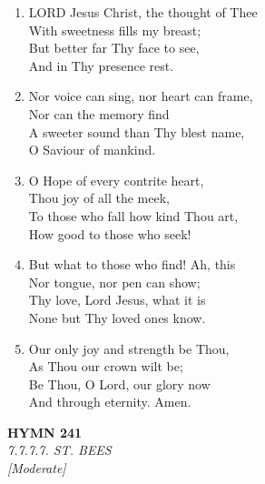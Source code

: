 \begin{enumerate}
    \item LORD Jesus Christ, the thought of Thee \\
        With sweetness fills my breast; \\
        But better far Thy face to see, \\
        And in Thy presence rest.

    \item Nor voice can sing, nor heart can frame, \\
        Nor can the memory find \\
        A sweeter sound than Thy blest name, \\
        O Saviour of mankind.

    \item O Hope of every contrite heart, \\
        Thou joy of all the meek, \\
        To those who fall how kind Thou art, \\
        How good to those who seek!

    \item But what to those who find! Ah, this \\
        Nor tongue, nor pen can show; \\
        Thy love, Lord Jesus, what it is \\
        None but Thy loved ones know.

    \item Our only joy and strength be Thou, \\
        As Thou our crown wilt be; \\
        Be Thou, O Lord, our glory now \\
        And through eternity. Amen.

\end{enumerate}

\newpage
\begin{center}
    {\Large \textbf{HYMN 241}}
    \\
    \textit{7.7.7.7. ST. BEES}
    \\
    \textit{\small [Moderate]}
\end{center}
\vspace{1em}

